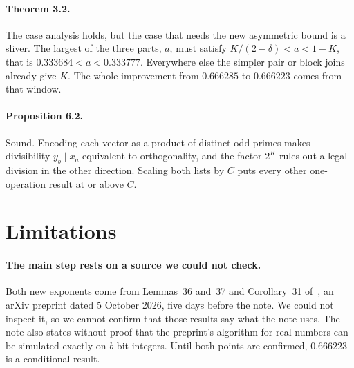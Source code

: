 \documentclass[11pt]{article}
\begin{document}
\paragraph{Theorem 3.2.}
The case analysis holds, but the case that needs the new asymmetric bound is a sliver. The largest of the
three parts, $a$, must satisfy $K/(2 - \delta) < a < 1 - K$, that is
$0.333684 < a < 0.333777$. Everywhere else the simpler pair or block joins already give $K$. The whole
improvement from $0.666285$ to $0.666223$ comes from that window.

\paragraph{Proposition 6.2.}
Sound. Encoding each vector as a product of distinct odd primes makes divisibility $y_b \mid x_a$
equivalent to orthogonality, and the factor $2^K$ rules out a legal division in the other direction.
Scaling both lists by $C$ puts every other one-operation result at or above $C$.

\section{Limitations}

\paragraph{The main step rests on a source we could not check.}
Both new exponents come from Lemmas~36 and~37 and Corollary~31 of~\cite{av}, an arXiv preprint dated
5 October 2026, five days before the note. We could not inspect it, so we cannot confirm that those
results say what the note uses. The note also states without proof that the preprint's algorithm for real
numbers can be simulated exactly on $b$-bit integers. Until both points are confirmed, $0.666223$ is a
conditional result.
\end{document}
